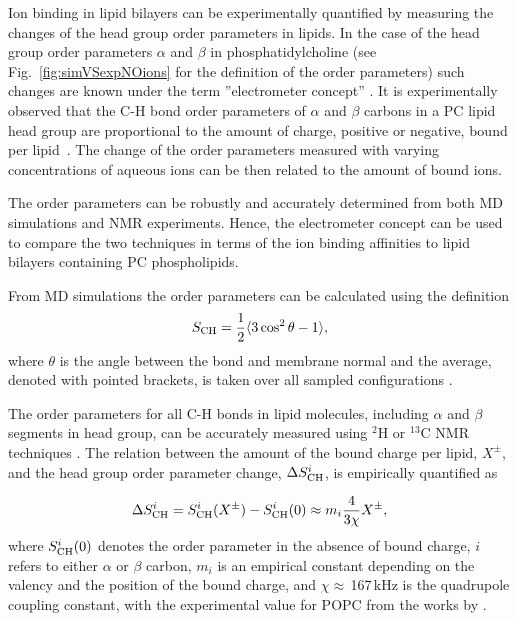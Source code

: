 Ion binding in lipid bilayers can be experimentally quantified
by measuring the changes of the head group order parameters in lipids.
In the case of the head group order parameters $\alpha$ and $\beta$ in phosphatidylcholine
(see Fig.~\ref{fig:simVSexpNOions} for the definition of the order parameters)
such changes are known under the term ''electrometer concept'' \citep{seelig87,catte16}. 
It is experimentally observed that the C-H bond
order parameters of $\alpha$ and $\beta$ carbons in a PC lipid head group
are proportional to the amount of charge, positive or negative, bound per lipid~\citep{seelig87}.
The change of the order parameters measured with varying concentrations of aqueous ions 
can be then related to the amount of bound ions.

The order parameters can be robustly and accurately determined from both MD simulations and  NMR experiments. 
Hence, the electrometer concept can be used to compare the two techniques
in terms of the ion binding affinities to lipid bilayers containing PC phospholipids.  \citep{catte16,ollila16} 

From MD simulations the order parameters can be calculated using the definition
\begin{equation}\label{OP} 
S_{\rm CH}=\frac{1}{2}\langle 3\cos^2\theta -1 \rangle, 
\end{equation} 
where $\theta$ is the angle between the  bond and membrane
normal and the average, denoted with pointed brackets, is taken over all sampled configurations \citep{ollila16}.

The order parameters for all C-H bonds in lipid molecules, including
$\alpha$ and $\beta$ segments in head group, can be accurately measured
using $^2$H or $^{13}$C NMR techniques \citep{ollila16}. 
The relation between the amount of the bound charge per lipid,  $X^\pm$, and
the head group order parameter change, $\Delta S_{\rm{CH}}^{i}$,
is empirically quantified as~\citep{seelig87,ferreira16}

\begin{equation}\label{OPchangeEQ} 
\Delta S_{\rm{CH}}^{i}= S_{\rm{CH}}^{i}(X^\pm)-S_{\rm{CH}}^{i}(0) \approx m_i \frac{4 }{3\chi}X^\pm, 
\end{equation} 
where $S_{\rm{CH}}^{i}(0)$ denotes the order parameter in the absence of bound charge,
$i$ refers to either $\alpha$ or $\beta$ carbon,
$m_i$ is an empirical constant depending on the valency and the position of the bound charge,
and $\chi \approx$\,167\,kHz is the quadrupole coupling constant, 
with the experimental value for POPC from the works by \citet{seelig77,Davis83}.

